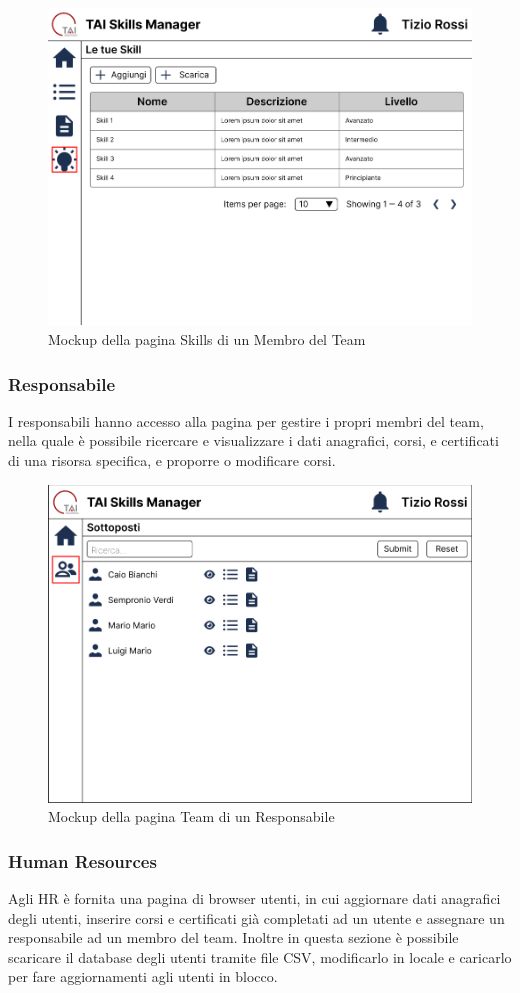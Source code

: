\FloatBarrier
\begin{figure}[ht!]  
    \centering
    \includegraphics[width=0.49\linewidth]{immagini/mockup/Pagina Skill Membro del Team.png}
    \caption{Mockup della pagina Skills di un Membro del Team}
    \label{mockup-skills}
\end{figure}
\FloatBarrier

\subsubsection{Responsabile}
I responsabili hanno accesso alla pagina per gestire i propri membri del team, nella quale è possibile ricercare e visualizzare i dati anagrafici, corsi, e certificati di una risorsa specifica, e proporre o modificare corsi.

\begin{figure}[ht!]  
    \centering
        \includegraphics[width=0.7\linewidth]{immagini/mockup/Pagina Sottoposti Manager.png}
        \caption{Mockup della pagina Team di un Responsabile}
        \label{mockup-team}
\end{figure}
\FloatBarrier

\subsubsection{Human Resources}
Agli HR è fornita una pagina di browser utenti, in cui aggiornare dati anagrafici degli utenti, inserire corsi e certificati già completati ad un utente e assegnare un responsabile ad un membro del team. Inoltre in questa sezione è possibile scaricare il database degli utenti tramite file CSV, modificarlo in locale e caricarlo per fare aggiornamenti agli utenti in blocco.

